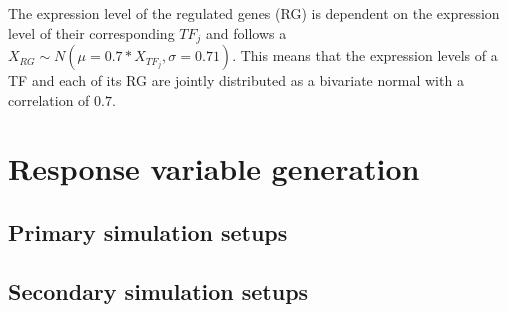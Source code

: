 The expression level of the regulated genes (RG) is dependent on the expression level of their corresponding $TF_j$ and follows a $X_{RG} \sim N(\mu = 0.7*X_{TF_j}, \sigma = 0.71)$. This means that the expression levels of a TF and each of its RG are jointly distributed as a bivariate normal with a correlation of $0.7$.

\section{Response variable generation}

\subsection{Primary simulation setups}

\subsection{Secondary simulation setups}